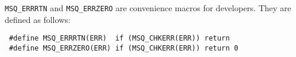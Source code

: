 \texttt{MSQ\_ERRRTN} and \texttt{MSQ\_ERRZERO}  are convenience macros for developers. They are defined as follows:
\begin{lstlisting}
 #define MSQ_ERRRTN(ERR)  if (MSQ_CHKERR(ERR)) return
 #define MSQ_ERRZERO(ERR) if (MSQ_CHKERR(ERR)) return 0
\end{lstlisting}

